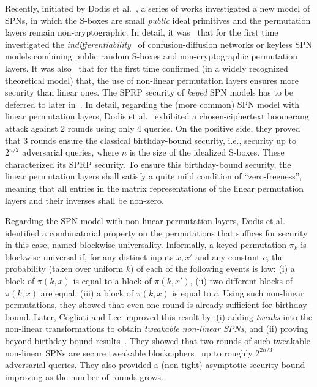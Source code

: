 \documentclass[journal=tosc,final,nohyperref]{iacrtrans}
\begin{document}
Recently, initiated by Dodis et al.~\cite{EC:DSSL16,EPRINT:DKSTZ17}, a series of works investigated a new model of SPNs, in which the S-boxes
are small {\it public} ideal primitives and the permutation layers remain non-cryptographic. In detail, it was~\cite{EC:DSSL16} that for the first time investigated the {\it indifferentiability}~\cite{TCC:MauRenHol04}
of confusion-diffusion networks or keyless SPN models combining public random S-boxes and non-cryptographic permutation layers. It was also~\cite{EC:DSSL16} that for the first time confirmed (in a widely recognized theoretical model) that, the use of non-linear permutation layers ensures more security than linear ones. The SPRP security of {\it keyed} SPN models has to be deferred to later in~\cite{EPRINT:DKSTZ17,C:CDKLST18}. In detail, regarding the (more common) SPN model with linear permutation layers, Dodis et al.~\cite{EPRINT:DKSTZ17} exhibited a chosen-ciphertext boomerang attack against 2 rounds using only 4 queries. On the positive side, they proved that 3 rounds ensure the classical birthday-bound security, i.e., security up to $2^{n/2}$ adversarial queries, where $n$ is the size of the idealized S-boxes. These characterized its SPRP security. To ensure this birthday-bound security, the linear permutation layers shall satisfy a quite mild condition of ``zero-freeness'', meaning that all entries in the matrix representations of the linear permutation layers and their inverses shall be non-zero.



Regarding the SPN model with non-linear permutation layers, Dodis et al.~\cite{EPRINT:DKSTZ17} identified a combinatorial property on the permutations that suffices for security in this case, named blockwise universality. Informally, a keyed permutation $\pi_k$ is blockwise universal if, for any distinct inputs $x,x'$ and any constant $c$, the probability (taken over uniform $k$) of each of the following events is low: (i) a block of $\pi(k,x)$ is equal to a block of $\pi(k,x')$, (ii) two different blocks of $\pi(k,x)$ are equal, (iii) a block of $\pi(k,x)$ is equal to $c$. Using such non-linear permutations, they showed that even one round is already sufficient for birthday-bound. Later, Cogliati and Lee improved this result by: (i) adding {\it tweaks} into the non-linear transformations
to obtain {\it tweakable non-linear SPNs}, and (ii) proving beyond-birthday-bound results~\cite{EPRINT:CogLee18}. They showed that two rounds of such tweakable non-linear SPNs are secure tweakable blockciphers~\cite{JC:LisRivWag11} up to roughly $2^{2n/3}$ adversarial queries. They also provided a (non-tight) asymptotic security bound improving as the number of rounds grows.
\end{document}
